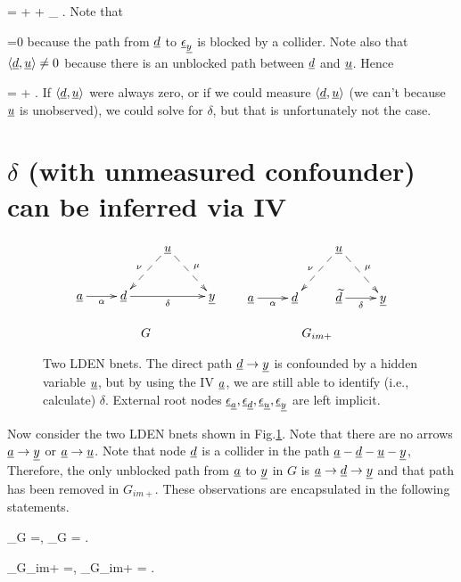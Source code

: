 \beq
\rvy = \delta \rvd +
 \mu \rvu + \rveps_\rvy
\;.
\eeq
Note that

\beq
\av{\rvd, \rveps_\rvy}=0
\eeq
because the path from ${\underline{d}}$ to $\underline{\epsilon}_{\underline{y}}$
is blocked by a collider. Note also that
$\left\langle{\underline{d}}, {\underline{u}}\right\rangle\neq 0$ because 
there is an unblocked path 
between ${\underline{d}}$ and ${\underline{u}}$.
Hence

\beq
\av{\rvd, \rvy} = \delta \av{\rvd, \rvd}
+ \mu\av{\rvd,\rvu}
\;.
\eeq
If $\left\langle{\underline{d}},{\underline{u}}\right\rangle$ were always zero,
or if we could measure $\left\langle{\underline{d}},{\underline{u}}\right\rangle$
(we can't because ${\underline{u}}$ is unobserved),
we could solve for $\delta$,
but that is unfortunately not the case.


\section{$\delta$
(with unmeasured confounder)
can be
inferred via IV}



\begin{figure}[h!]
$$
\begin{array}{ccc}
\xymatrix{
&&\rvu\ar@{-->}[dl]_\nu\ar@{-->}[dr]^\mu
\\
\rva\ar[r]_\alpha
&\rvd\ar[rr]_\delta
&&\rvy
}
&&
\xymatrix{
&&\rvu\ar@{-->}[dl]_\nu\ar@{-->}[dr]^\mu
\\
\rva\ar[r]_\alpha
&\rvd&
\rvtd\ar[r]_\delta
&\rvy}
\\
\\
G&&G_{im+}
\end{array}
$$
\caption{
Two LDEN bnets. The direct path ${\underline{d}}\rightarrow{\underline{y}}$
is confounded by
a hidden variable ${\underline{u}}$, but
by using the IV ${\underline{a}}$, we are still
able to 
identify (i.e., calculate)
$\delta$.
External root nodes $\underline{\epsilon}_{\underline{a}}, \underline{\epsilon}_{\underline{d}},
\underline{\epsilon}_{\underline{u}}, \underline{\epsilon}_{\underline{y}}$ are left implicit.
}
\label{fig-iv-G-im}
\end{figure}

Now consider the two LDEN bnets 
shown in Fig.\ref{fig-iv-G-im}.
Note that there are no arrows
${\underline{a}}\rightarrow{\underline{y}}$
or 
${\underline{a}}\rightarrow{\underline{u}}$. Note that
node ${\underline{d}}$ is a collider
in the path 
${\underline{a}}-{\underline{d}}-{\underline{u}}-{\underline{y}}$, 
Therefore,
the only unblocked path
from ${\underline{a}}$ to 
${\underline{y}}$ in $G$ 
is ${\underline{a}}\rightarrow{\underline{d}}\rightarrow{\underline{y}}$
and that path has been
removed in $G_{im+}$. These
observations are 
encapsulated in the following statements.

\beq
\rvd\perp_{G} \rvy =, 
\;\; \rva\perp_{G} \rvy= 
\;.
\eeq

\beq
\rvd\perp_{G_{im+}} \rvy =, 
\;\; \rva\perp_{G_{im+}} \rvy= 
\;.
\eeq



